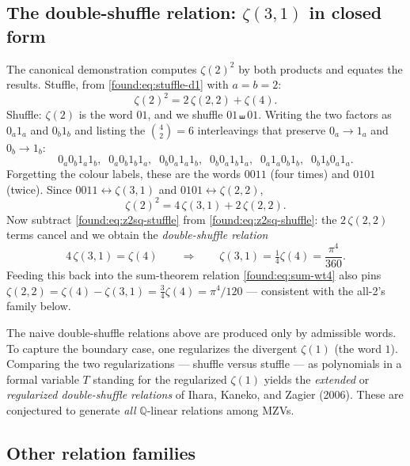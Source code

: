 \subsection*{The double-shuffle relation: $\zeta(3,1)$ in closed form}

The canonical demonstration computes $\zeta(2)^2$ by both products and equates the results. Stuffle, from \eqref{found:eq:stuffle-d1} with $a=b=2$:
\begin{equation}
  \zeta(2)^2=2\,\zeta(2,2)+\zeta(4).
  \label{found:eq:z2sq-stuffle}
\end{equation}
Shuffle: $\zeta(2)$ is the word $01$, and we shuffle $01\shuffle01$. Writing the two factors as $0_a1_a$ and $0_b1_b$ and listing the $\binom{4}{2}=6$ interleavings that preserve $0_a\!\to\!1_a$ and $0_b\!\to\!1_b$:
\[
  0_a0_b1_a1_b,\;\;0_a0_b1_b1_a,\;\;0_b0_a1_a1_b,\;\;0_b0_a1_b1_a,\;\;0_a1_a0_b1_b,\;\;0_b1_b0_a1_a.
\]
Forgetting the colour labels, these are the words $0011$ (four times) and $0101$ (twice). Since $0011\leftrightarrow\zeta(3,1)$ and $0101\leftrightarrow\zeta(2,2)$,
\begin{equation}
  \zeta(2)^2=4\,\zeta(3,1)+2\,\zeta(2,2).
  \label{found:eq:z2sq-shuffle}
\end{equation}
Now subtract \eqref{found:eq:z2sq-stuffle} from \eqref{found:eq:z2sq-shuffle}: the $2\,\zeta(2,2)$ terms cancel and we obtain the \emph{double-shuffle relation}
\begin{equation}
  4\,\zeta(3,1)=\zeta(4)
  \qquad\Longrightarrow\qquad
  \zeta(3,1)=\tfrac14\zeta(4)=\frac{\pi^4}{360}.
  \label{found:eq:z31}
\end{equation}
Feeding this back into the sum-theorem relation \eqref{found:eq:sum-wt4} also pins $\zeta(2,2)=\zeta(4)-\zeta(3,1)=\tfrac34\zeta(4)=\pi^4/120$ --- consistent with the all-2's family below.

\begin{remark}
The naive double-shuffle relations above are produced only by admissible words. To capture the boundary case, one regularizes the divergent $\zeta(1)$ (the word $1$). Comparing the two regularizations --- shuffle versus stuffle --- as polynomials in a formal variable $T$ standing for the regularized $\zeta(1)$ yields the \emph{extended} or \emph{regularized double-shuffle relations} of Ihara, Kaneko, and Zagier (2006). These are conjectured to generate \emph{all} $\mathbb{Q}$-linear relations among MZVs.
\end{remark}

\subsection*{Other relation families}

